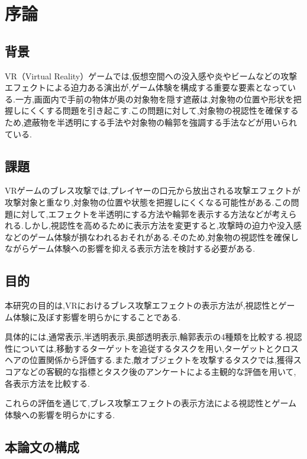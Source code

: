\chapter{序論}

\section{背景}

VR（Virtual Reality）ゲームでは,仮想空間への没入感や炎やビームなどの攻撃エフェクトによる迫力ある演出が,ゲーム体験を構成する重要な要素となっている.一方,画面内で手前の物体が奥の対象物を隠す遮蔽は,対象物の位置や形状を把握しにくくする問題を引き起こす.この問題に対して,対象物の視認性を確保するため,遮蔽物を半透明にする手法や対象物の輪郭を強調する手法などが用いられている.

\section{課題}

VRゲームのブレス攻撃では,プレイヤーの口元から放出される攻撃エフェクトが攻撃対象と重なり,対象物の位置や状態を把握しにくくなる可能性がある.この問題に対して,エフェクトを半透明にする方法や輪郭を表示する方法などが考えられる.しかし,視認性を高めるために表示方法を変更すると,攻撃時の迫力や没入感などのゲーム体験が損なわれるおそれがある.そのため,対象物の視認性を確保しながらゲーム体験への影響を抑える表示方法を検討する必要がある.

\section{目的}

本研究の目的は,VRにおけるブレス攻撃エフェクトの表示方法が,視認性とゲーム体験に及ぼす影響を明らかにすることである.

具体的には,通常表示,半透明表示,奥部透明表示,輪郭表示の4種類を比較する.視認性については,移動するターゲットを追従するタスクを用い,ターゲットとクロスヘアの位置関係から評価する.また,敵オブジェクトを攻撃するタスクでは,獲得スコアなどの客観的な指標とタスク後のアンケートによる主観的な評価を用いて,各表示方法を比較する.

これらの評価を通じて,ブレス攻撃エフェクトの表示方法による視認性とゲーム体験への影響を明らかにする.


\section{本論文の構成}
